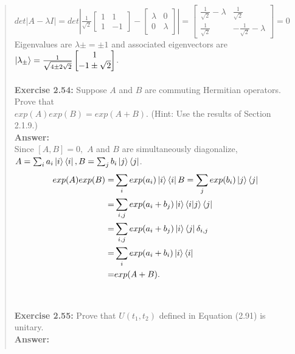 \documentclass[UTF8]{ctexart}
\begin{document}
\begin{quote}
$det|A-\lambda I|=det\left|\frac{1}{\sqrt{2}}\begin{bmatrix}
	1 & 1 \\1 & -1
\end{bmatrix}-\begin{bmatrix}
	\lambda & 0 \\0 & \lambda
\end{bmatrix}\right|=
\begin{bmatrix}
	\frac{1}{\sqrt{2}}-\lambda & \frac{1}{\sqrt{2}} \\
	\frac{1}{\sqrt{2}} & -\frac{1}{\sqrt{2}}-\lambda
\end{bmatrix}=0
$\\
Eigenvalues are $λ\pm = \pm 1$ and associated eigenvectors are 
$\ket{\lambda_{\pm}}=\frac{1}{\sqrt{4\pm 2 \sqrt{2}}}\begin{bmatrix}
	1 \\ -1\pm \sqrt{2}
\end{bmatrix}$.
\\
\\
\textbf{Exercise 2.54: } Suppose $A$ and $B$ are commuting Hermitian operators. Prove that \\
$exp(A) exp(B) = exp(A + B).$ (Hint: Use the results of Section 2.1.9.)
\\
\textbf{Answer:}\\
Since $[A, B] = 0,$ $A$ and $B$ are simultaneously diagonalize, $A = \sum_{i} a_{i} \ket{i}\bra{i}, B = \sum_{j} b_{i}\ket{j}\bra{j}$.
\begin{equation}
	\begin{aligned}
		exp(A) exp(B)=&\sum_{i}exp(a_{i}) \ket{i}\bra{i} B = \sum_{j} exp(b_{i})\ket{j}\bra{j} \\
					 =&\sum_{i,j}exp(a_{i}+b_{j})\ket{i}\bra{i}\ket{j}\bra{j}\\
					 =&\sum_{i,j}exp(a_{i}+b_{j})\ket{i}\bra{j}\delta_{i,j} \\
					 =&\sum_{i}exp(a_{i}+b_{i})\ket{i}\bra{i}\\
					 =&exp(A+B).\\
	\end{aligned}
	\end{equation}
	\\
	\\
\textbf{Exercise 2.55: } 
Prove that $U(t_{1},t_{2})$ defined in Equation (2.91) is unitary.
\\
\textbf{Answer:}\\
\begin{equation}
	\begin{aligned}

\end{aligned}
\end{equation}
\end{quote}
\end{document}
